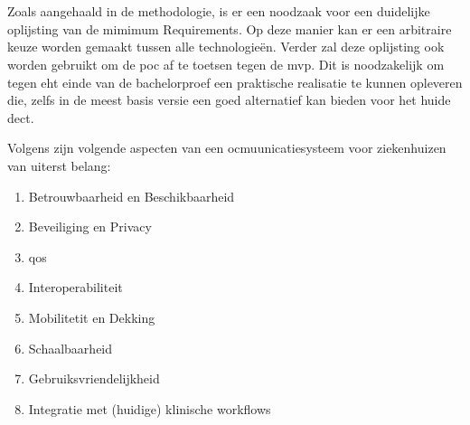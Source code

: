 \chapter{}%
\label{ch:minreq}

Zoals aangehaald in de methodologie, is er een noodzaak voor een duidelijke oplijsting van de mimimum Requirements. Op deze manier kan er een arbitraire keuze worden gemaakt tussen alle technologieën. Verder zal deze oplijsting ook worden gebruikt om de \acrshort{poc} af te toetsen tegen de \acrshort{mvp}. Dit is noodzakelijk om tegen eht einde van de bachelorproef een praktische realisatie te kunnen opleveren die, zelfs in de meest basis versie een goed alternatief kan bieden voor het huide \acrshort{dect}.

Volgens \textcite{Coiera2006} zijn volgende aspecten van een ocmuunicatiesysteem voor ziekenhuizen van uiterst belang:

\begin{enumerate}
    \item Betrouwbaarheid en Beschikbaarheid
    \item Beveiliging en Privacy
    \item \acrfull{qos}
    \item Interoperabiliteit
    \item Mobilitetit en Dekking
    \item Schaalbaarheid
    \item Gebruiksvriendelijkheid
    \item Integratie met (huidige) klinische workflows 
\end{enumerate}

\section{}

\section{}

\section{}

